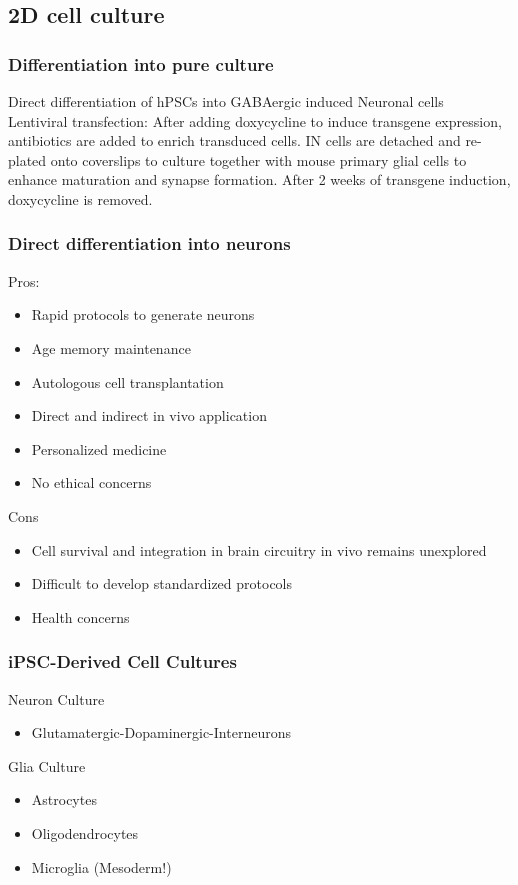 \begin{itemize}
\subsection{2D cell culture}
\subsubsection{Differentiation into pure culture}
Direct differentiation of hPSCs into GABAergic induced Neuronal cells
\\Lentiviral transfection: After adding doxycycline to induce transgene expression, antibiotics are added to enrich transduced cells. IN cells are detached and re-plated onto coverslips to culture together with mouse primary glial cells to enhance maturation and synapse formation. After 2 weeks of transgene induction, doxycycline is removed.
\subsubsection{Direct differentiation into neurons}
Pros:
\begin{itemize}
    \item Rapid protocols to generate neurons
    \item Age memory maintenance
    \item Autologous cell transplantation
    \item Direct and indirect in vivo application
    \item Personalized medicine
    \item No ethical concerns
    
\end{itemize}
Cons
\begin{itemize}
    \item Cell survival and integration in brain circuitry in vivo remains unexplored
    \item Difficult to develop standardized protocols
    \item Health concerns
\end{itemize}
\subsubsection{iPSC-Derived Cell Cultures}
Neuron Culture
\begin{itemize}
    \item Glutamatergic-Dopaminergic-Interneurons
\end{itemize}
Glia Culture
\begin{itemize}
    \item Astrocytes
    \item Oligodendrocytes
    \item Microglia (Mesoderm!)
\end{itemize}

\end{itemize}
